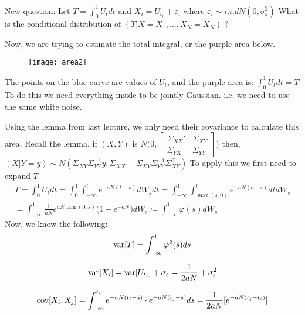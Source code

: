 \documentclass[../../../Master/AppliedStochastics.tex]{subfiles}
\begin{document}
New question: Let $T=\int_{0}^{1} U_{t}dt$ 
and $X_{i} = U_{t_{i}} + \varepsilon_{i}$ where $\varepsilon_{i}\sim i.i.d N(0,\sigma_{\varepsilon}^2)$ 
What is the conditional distribution of $(T\vert X=X_{1},\dotso, X_{N}=X_{N})$ ? 

Now, we are trying to estimate the total integral, or the purple area below. 
\begin{figure}[H]
	\centering
	\texttt{[image: area2]}
	\caption*{}
	\label{fig:area2}
\end{figure}
The points on the blue curve are values of $U_{t}$, 
and the purple area is: $\int_{0}^{1} U_{t}dt = T$ 
To do this we need everything inside to be jointly Gaussian. 
i.e. we need to use the same white noise. 

Using the lemma from last lecture, 
we only need their covariance to calculate this area.
Recall the lemma,
if $(X,Y)$ is $N\Bigg(0, \begin{bmatrix} \Sigma_{XX}' & \Sigma_{XY} \\ \Sigma_{YX} & \Sigma_{YY}\end{bmatrix}\Bigg)$
then, $(X\vert Y=y) \sim N(\Sigma_{XY}\Sigma_{YY}^{-1}y, \Sigma_{XX}-\Sigma_{XY}\Sigma_{YY}^{-1}\Sigma_{XY}^{\intercal})$
To apply this we first need to expand $T$ 
$$\begin{aligned}
T = \int_{0}^{1} U_{t}dt = \int_{0}^{1}\int_{-\infty}^{t} e^{-aN(t-s)} dW_{s}dt 
=\int_{-\infty}^{1}\int_{\max(s,0)}^{t} e^{-aN(t-s)} dtdW_{s}\\
=\int_{-\infty}^{1} \frac{1}{aN}e^{aN\min(0,s)}\big(1-e^{-aN}\big)dW_{s}\coloneqq \int_{-\infty}^{1}\varphi(s)dW_{s}
\end{aligned}$$ 
Now, we know the following: 
$$\begin{aligned}
\var[T] = \int_{-\infty}^{1} \varphi^{2}(s) ds 
\end{aligned}$$ 

$$\begin{aligned}
\operatorname{var}[X_{i}] = \operatorname{var}[U_{t_{i}}] + \sigma_{\varepsilon} = \frac{1}{2aN} + \sigma_{\varepsilon}^2 
\end{aligned}$$ 

$$\begin{aligned}
\operatorname{cov}[X_{i}, X_{j}] = \int_{-\infty}^{t_{i}}e^{-aN(t_{i}-s)}\cdot e^{-aN(t_{j}-s)} ds = \frac{1}{2aN}[e^{-aN(t_{j}-t_{i})}]
\end{aligned}$$
\end{document}
